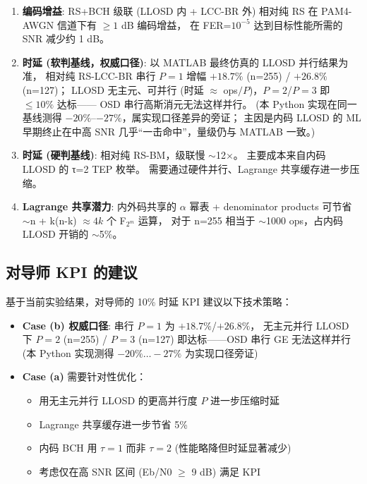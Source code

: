 \documentclass[11pt,a4paper]{article}
\begin{document}
\begin{keybox}[title=\textbf{课题核心发现}]
\begin{enumerate}[leftmargin=1.5em, itemsep=2pt]
\item \textbf{编码增益}: RS+BCH 级联 (LLOSD 内 + LCC-BR 外) 相对纯 RS
      在 PAM4-AWGN 信道下有 $\geq 1$ dB 编码增益，
      在 FER=$10^{-5}$ 达到目标性能所需的 SNR 减少约 1 dB。

\item \textbf{时延 (软判基线，权威口径)}: 以 MATLAB 最终仿真的 LLOSD 并行结果为准，
      相对纯 RS-LCC-BR 串行 $P{=}1$ 增幅 $+18.7\%$ (n=255) / $+26.8\%$ (n=127)；
      LLOSD 无主元、可并行 (时延 $\approx$ ops$/P$)，$P{=}2$/$P{=}3$ 即 $\leq 10\%$ 达标——
      OSD 串行高斯消元无法这样并行。
      (本 Python 实现在同一基线测得 $-20\%$--$-27\%$，属实现口径差异的旁证；
      主因是内码 LLOSD 的 ML 早期终止在中高 SNR 几乎``一击命中''，量级仍与 MATLAB 一致。)

\item \textbf{时延 (硬判基线)}: 相对纯 RS-BM，级联慢 $\sim$12$\times$。
      主要成本来自内码 LLOSD 的 τ=2 TEP 枚举。
      需要通过硬件并行、Lagrange 共享缓存进一步压缩。

\item \textbf{Lagrange 共享潜力}: 内外码共享的 $\alpha$ 幂表 + denominator
      products 可节省 $\sim$n + k(n-k) $\approx 4k$ 个 F$_{2^m}$ 运算，
      对于 n=255 相当于 $\sim$1000 ops，占内码 LLOSD 开销的 $\sim$5\%。
\end{enumerate}
\end{keybox}

\subsection{对导师 KPI 的建议}

基于当前实验结果，对导师的 10\% 时延 KPI 建议以下技术策略：

\begin{itemize}[leftmargin=1.5em, itemsep=1pt]
\item \textbf{Case (b) 权威口径}: 串行 $P{=}1$ 为 $+18.7\%$/$+26.8\%$，
  无主元并行 LLOSD 下 $P{=}2$ (n=255) / $P{=}3$ (n=127) 即达标——OSD 串行 GE 无法这样并行
  (本 Python 实现测得 $-20\%\ldots-27\%$ 为实现口径旁证)
\item \textbf{Case (a)} 需要针对性优化：
  \begin{itemize}[leftmargin=1em]
  \item 用无主元并行 LLOSD 的更高并行度 $P$ 进一步压缩时延
  \item Lagrange 共享缓存进一步节省 5\%
  \item 内码 BCH 用 $\tau=1$ 而非 $\tau=2$ (性能略降但时延显著减少)
  \item 考虑仅在高 SNR 区间 (Eb/N0 $\geq$ 9 dB) 满足 KPI
  \end{itemize}
\end{itemize}
\end{document}

